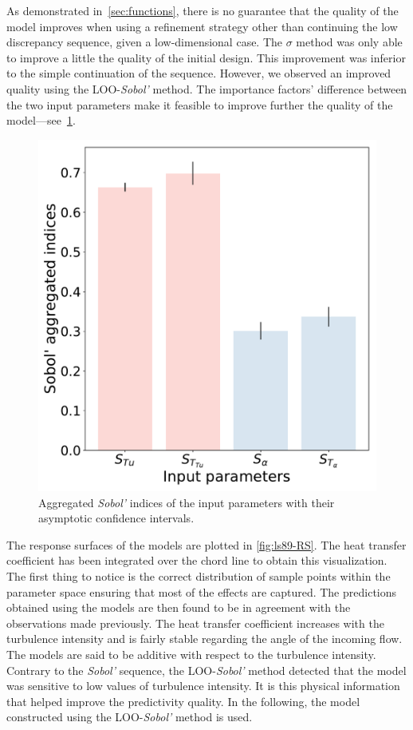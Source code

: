 As demonstrated in~\cref{sec:functions}, there is no guarantee that the quality of the model improves when using a refinement strategy other than continuing the low discrepancy sequence, given a low-dimensional case. The $\sigma$ method was only able to improve a little the quality of the initial design. This improvement was inferior to the simple continuation of the sequence. However, we observed an improved quality using the LOO-\textit{Sobol'} method. The importance factors' difference between the two input parameters make it feasible to improve further the quality of the model---see~\cref{fig:ls89-aggregated}.

\begin{figure}[h]
\centering
\includegraphics[width=0.5\linewidth]{fig/applications/ls89/15_1column_color-online-only_aggregated_indices.pdf}
\caption{Aggregated \textit{Sobol'} indices of the input parameters with their asymptotic confidence intervals.}
\label{fig:ls89-aggregated}
\end{figure}

The response surfaces of the models are plotted in \cref{fig:ls89-RS}. The heat transfer coefficient has been integrated over the chord line to obtain this visualization. The first thing to notice is the correct distribution of sample points within the parameter space ensuring that most of the effects are captured. The predictions obtained using the models are then found to be in agreement with the observations made previously. The heat transfer coefficient increases with the turbulence intensity and is fairly stable regarding the angle of the incoming flow. The models are said to be additive with respect to the turbulence intensity. Contrary to the \textit{Sobol'} sequence, the LOO-\textit{Sobol'} method detected that the model was sensitive to low values of turbulence intensity. It is this physical information that helped improve the predictivity quality. In the following, the model constructed using the LOO-\textit{Sobol'} method is used.

